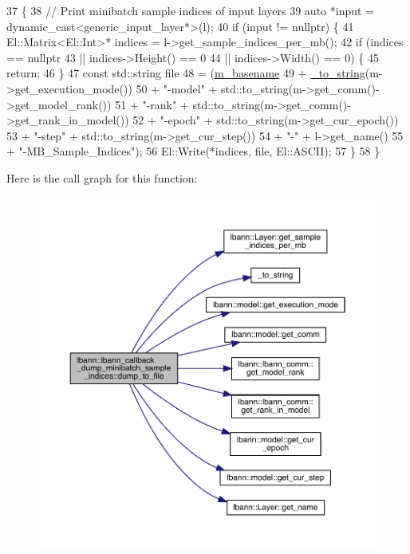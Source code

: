 \begin{DoxyCode}
37                                                                                                 \{
38   \textcolor{comment}{// Print minibatch sample indices of input layers}
39   \textcolor{keyword}{auto} *input = \textcolor{keyword}{dynamic\_cast<}generic\_input\_layer*\textcolor{keyword}{>}(l);
40   \textcolor{keywordflow}{if} (input != \textcolor{keyword}{nullptr}) \{
41     El::Matrix<El::Int>* indices = l->get\_sample\_indices\_per\_mb();
42     \textcolor{keywordflow}{if} (indices == \textcolor{keyword}{nullptr}
43         || indices->Height() == 0
44         || indices->Width() == 0) \{
45       \textcolor{keywordflow}{return};
46     \}
47     \textcolor{keyword}{const} std::string file
48       = (\hyperlink{classlbann_1_1lbann__callback__dump__minibatch__sample__indices_a75ef9a964cb1e1281e4721beef14c265}{m\_basename}
49          + \hyperlink{base_8hpp_adeeaddd10bd31df0cae7cb0fcae45d5c}{\_to\_string}(m->get\_execution\_mode())
50          + \textcolor{stringliteral}{"-model"} + std::to\_string(m->get\_comm()->get\_model\_rank())
51          + \textcolor{stringliteral}{"-rank"} + std::to\_string(m->get\_comm()->get\_rank\_in\_model())
52          + \textcolor{stringliteral}{"-epoch"} + std::to\_string(m->get\_cur\_epoch())
53          + \textcolor{stringliteral}{"-step"} + std::to\_string(m->get\_cur\_step())
54          + \textcolor{stringliteral}{"-"} + l->get\_name()
55          + \textcolor{stringliteral}{"-MB\_Sample\_Indices"});
56     El::Write(*indices, file, El::ASCII);
57   \}
58 \}
\end{DoxyCode}
Here is the call graph for this function\+:\nopagebreak
\begin{figure}[H]
\begin{center}
\leavevmode
\includegraphics[width=350pt]{classlbann_1_1lbann__callback__dump__minibatch__sample__indices_a34d4564309168b3ab0b2e3092e2f9355_cgraph}
\end{center}
\end{figure}
